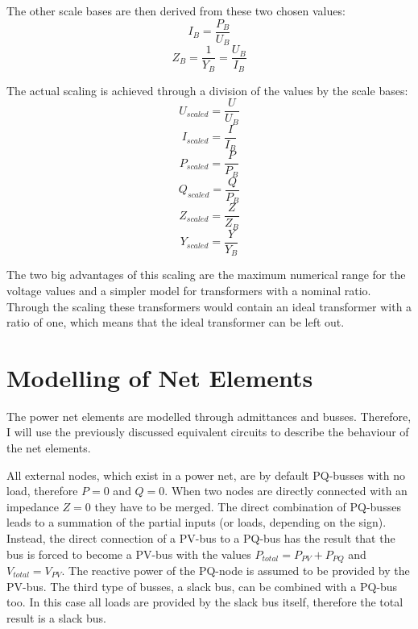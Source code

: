 The other scale bases are then derived from these two chosen values:
\begin{equation}
	I_B = \frac{P_B}{U_B}
\end{equation}
\begin{equation}
	Z_B = \frac{1}{Y_B} = \frac{U_B}{I_B}
\end{equation}

The actual scaling is achieved through a division of the values by the scale bases:
\begin{equation}
	U_{scaled} = \frac{U}{U_B}
\end{equation}
\begin{equation}
	I_{scaled} = \frac{I}{I_B}
\end{equation}
\begin{equation}
	P_{scaled} = \frac{P}{P_B}
\end{equation}
\begin{equation}
	Q_{scaled} = \frac{Q}{P_B}
\end{equation}
\begin{equation}
	Z_{scaled} = \frac{Z}{Z_B}
\end{equation}
\begin{equation}
	Y_{scaled} = \frac{Y}{Y_B}
	\label{eq:scaling_admittance}
\end{equation}

The two big advantages of this scaling are the maximum numerical range for the voltage values and a simpler model for transformers with a nominal ratio. Through the scaling these transformers would contain an ideal transformer with a ratio of one, which means that the ideal transformer can be left out.

\section{Modelling of Net Elements}
\label{sec:modelling}

The power net elements are modelled through admittances and busses. Therefore, I will use the previously discussed equivalent circuits to describe the behaviour of the net elements.

All external nodes, which exist in a power net, are by default PQ-busses with no load, therefore $P = 0$ and $Q = 0$. When two nodes are directly connected with an impedance $Z = 0$ they have to be merged. The direct combination of PQ-busses leads to a summation of the partial inputs (or loads, depending on the sign). Instead, the direct connection of a PV-bus to a PQ-bus has the result that the bus is forced to become a PV-bus with the values $P_{total} = P_{PV} + P_{PQ}$ and $V_{total} = V_{PV}$. The reactive power of the PQ-node is assumed to be provided by the PV-bus. The third type of busses, a slack bus, can be combined with a PQ-bus too. In this case all loads are provided by the slack bus itself, therefore the total result is a slack bus.

